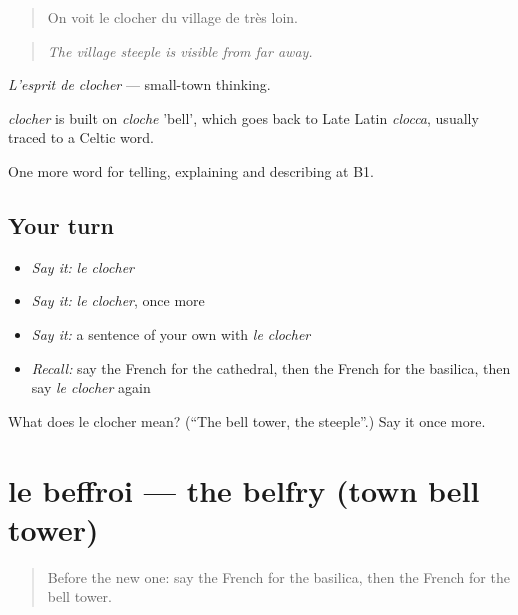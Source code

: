 \begin{quote}
On voit le clocher du village de très loin.
\end{quote}

\begin{quote}
\emph{The village steeple is visible from far away.}
\end{quote}

\emph{L'esprit de clocher} — small-town thinking.

\begin{cousinweb}
\emph{clocher} is built on \emph{cloche} 'bell', which goes back to Late Latin \emph{clocca}, usually traced to a Celtic word.
\end{cousinweb}

\begin{grammarlens}[title={What you've built}]
One more word for telling, explaining and describing at B1.
\end{grammarlens}

\subsection*{Your turn}
\begin{itemize}
\raggedright
  \item \emph{Say it:} \emph{le clocher}
  \item \emph{Say it:} \emph{le clocher}, once more
  \item \emph{Say it:} a sentence of your own with \emph{le clocher}
  \item \emph{Recall:} say the French for the cathedral, then the French for the basilica, then say \emph{le clocher} again
\end{itemize}

\begin{tcolorbox}[breakable,colback=teal!4,colframe=teal!35!black,title={Before you move on}]
What does le clocher mean? (\textquotedblleft{}The bell tower, the steeple\textquotedblright{}.) Say it once more.
\end{tcolorbox}
\section[le beffroi]{le beffroi — the belfry (town bell tower)}

\label{lesson:FR-C439-beffroi}



\begin{quote}
Before the new one: say the French for the basilica, then the French for the bell tower.
\end{quote}

